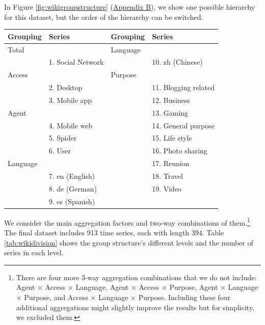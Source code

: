 \documentclass[11pt,a4paper,]{article}
\let\origtable\table
\let\endorigtable\endtable
\renewenvironment{table}[1][2] {
    \expandafter\origtable\expandafter[!htbp]
} {
    \endorigtable
}
\begin{document}
In Figure \ref{fig:wikigroupstructure} (\protect\hyperlink{appendixB}{Appendix B}), we show one possible hierarchy for this dataset, but the order of the hierarchy can be switched.

\begin{table}

\caption{\label{tab:wikipediagroupingstructure}Social networking Wikipedia article grouping structure}
\centering
\begin{tabular}[t]{llll}
\toprule
Grouping & Series & Grouping & Series\\
\midrule
Total &  & Language & \\
 & 1. Social Network &  & 10. zh (Chinese)\\
Access &  & Purpose & \\
 & 2. Desktop &  & 11. Blogging related\\
 & 3. Mobile app &  & 12. Business\\
Agent &  &  & 13. Gaming\\
 & 4.  Mobile web &  & 14. General purpose\\
 & 5. Spider &  & 15. Life style\\
 & 6. User &  & 16. Photo sharing\\
Language &  &  & 17. Reunion\\
 & 7. en (English) &  & 18. Travel\\
 & 8. de (German) &  & 19. Video\\
 & 9. es (Spanish) &  & \\
\bottomrule
\end{tabular}
\end{table}

We consider the main aggregation factors and two-way combinations of them.\footnote{There are four more 3-way aggregation combinations that we do not include: Agent \(\times\) Access \(\times\) Language, Agent \(\times\) Access \(\times\) Purpose, Agent \(\times\) Language \(\times\) Purpose, and Access \(\times\) Language \(\times\) Purpose. Including these four additional aggregations might slightly improve the results but for simplicity, we excluded them.} The final dataset includes 913 time series, each with length 394. Table \ref{tab:wikidivision} shows the group structure's different levels and the number of series in each level.
\end{document}
